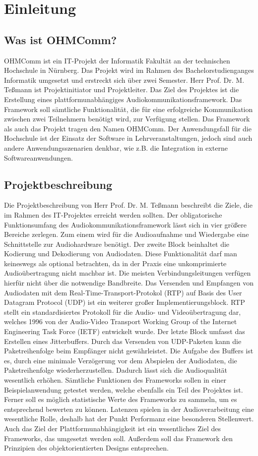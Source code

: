 \chapter{Einleitung}
\section{Was ist OHMComm?}
OHMComm ist ein IT-Projekt der Informatik Fakultät an der technischen Hochschule in Nürnberg. Das Projekt wird im Rahmen des Bachelorstudienganges Informatik umgesetzt und erstreckt sich über zwei Semester. Herr Prof. Dr. M. Teßmann ist Projektinitiator und Projektleiter. Das Ziel des Projektes ist die Erstellung eines plattformunabhängiges Audiokommunikationsframework. Das Framework soll sämtliche Funktionalität, die für eine erfolgreiche Kommunikation zwischen zwei Teilnehmern benötigt wird, zur Verfügung stellen. Das Framework als auch das Projekt tragen den Namen OHMComm. Der Anwendungsfall für die Hochschule ist der Einsatz der Software in Lehrveranstaltungen, jedoch sind auch andere Anwendungsszenarien denkbar, wie z.B. die Integration in externe Softwareanwendungen.

\section{Projektbeschreibung}
Die Projektbeschreibung von Herr Prof. Dr. M. Teßmann beschreibt die Ziele, die im Rahmen des IT-Projektes erreicht werden sollten. Der obligatorische Funktionsumfang des Audiokommunikationsframework lässt sich in vier größere Bereiche zerlegen. Zum einem wird für die Audioaufnahme und Wiedergabe eine Schnittstelle zur Audiohardware benötigt. Der zweite Block beinhaltet die Kodierung und Dekodierung von Audiodaten. Diese Funktionalität darf man keineswegs als optional betrachten, da in der Praxis eine unkomprimierte Audioübertragung nicht machbar ist. Die meisten Verbindungsleitungen verfügen hierfür nicht über die notwendige Bandbreite. Das Versenden und Empfangen von Audiodaten mit dem Real-Time-Transport-Protokol (RTP) auf Basis des User Datagram Protocol (UDP) ist ein weiterer großer Implementierungsblock. RTP stellt ein standardisiertes Protokoll für die Audio- und Videoübertragung dar, welches 1996 von der Audio-Video Transport Working Group of the Internet Engineering Task Force (IETF) entwickelt wurde. Der letzte Block umfasst das Erstellen eines Jitterbuffers. Durch das Versenden von UDP-Paketen kann die Paketreihenfolge beim Empfänger nicht gewährleistet. Die Aufgabe des Buffers ist es, durch eine minimale Verzögerung vor dem Abspielen der Audiodaten, die Paketreihenfolge wiederherzustellen. Dadurch lässt sich die Audioqualität wesentlich erhöhen. Sämtliche Funktionen des Frameworks sollen in einer Beispielanwendung getestet werden, welche ebenfalls ein Teil des Projektes ist. Ferner soll es möglich statistische Werte des Frameworks zu sammeln, um es entsprechend bewerten zu können. Latenzen spielen in der Audioverarbeitung eine wesentliche Rolle, deshalb hat der Punkt Performanz eine besonderen Stellenwert. Auch das Ziel der Plattformunabhängigkeit ist ein wesentliches Ziel des Frameworks, das umgesetzt werden soll. Außerdem soll das Framework den Prinzipien des objektorientierten Designs entsprechen.
	
